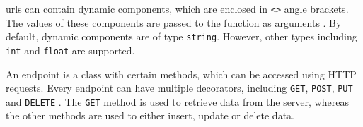 \acp{url} can contain dynamic components, which are enclosed in \texttt{<>} angle brackets.
The values of these components are passed to the function as arguments \cite{flask_book2018}.
By default, dynamic components are of type \texttt{string}.
However, other types including \texttt{int} and \texttt{float} are supported.


An endpoint is a class with certain methods, which can be accessed using HTTP requests.
Every endpoint can have multiple decorators, including \texttt{GET}, \texttt{POST}, \texttt{PUT} and \texttt{DELETE} \cite{flask2018}.
The \texttt{GET} method is used to retrieve data from the server, whereas the other methods are used to either insert, update or delete data.
